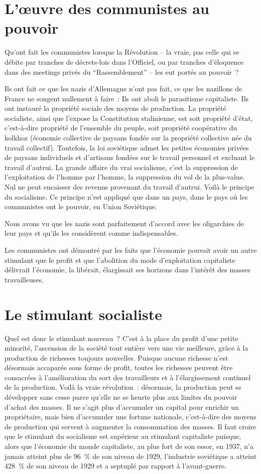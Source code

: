 \documentclass[french,twoside]{book} %
\begin{document}
\section[L’œuvre des communistes au pouvoir]{L’œuvre des communistes au pouvoir}
\noindent Qu’ont fait les communistes lorsque la Révolution – la vraie, pas celle qui se débite par tranches de décrets-lois dans l’Officiel, ou par tranches d’éloquence dans des meetings privés du “Rassemblement” – les eut portés au pouvoir ?\par
Ils ont fait ce que les nazis d’Allemagne n’ont pas fait, ce que les nazillons de France ne songent nullement à faire : Ils ont aboli le parasitisme capitaliste. Ils ont instauré la propriété sociale des moyens de production. La propriété socialiste, ainsi que l’expose la Constitution stalinienne, est soit propriété d’état, c’est-à-dire propriété de l’ensemble du peuple, soit propriété coopérative du kolkhoz (économie collective de paysans fondée sur la propriété collective née du travail collectif). Toutefois, la loi soviétique admet les petites économies privées de paysans individuels et d’artisans fondées sur le travail personnel et excluant le travail d’autrui. La grande affaire du vrai socialisme, c’est la suppression de l’exploitation de l’homme par l’homme, la suppression du vol de la plus-value. Nul ne peut encaisser des revenus provenant du travail d’autrui. Voilà le principe du socialisme. Ce principe n’est appliqué que dans un pays, dans le pays où les communistes ont le pouvoir, en Union Soviétique.\par
Nous avons vu que les nazis sont parfaitement d’accord avec les oligarchies de leur pays et qu’ils les considèrent comme indispensables.\par
Les communistes ont démontré par les faits que l’économie pouvait avoir un autre stimulant que le profit et que l’abolition du mode d’exploitation capitaliste délivrait l’économie, la libérait, élargissait ses horizons dans l’intérêt des masses travailleuses.
\section[Le stimulant socialiste]{Le stimulant socialiste}
\noindent Quel est donc le stimulant nouveau ? C’est à la place du profit d’une petite minorité, l’ascension de la société tout entière vers une vie meilleure, grâce à la production de richesses toujours nouvelles. Puisque aucune richesse n’est désormais accaparée sous forme de profit, toutes les richesses peuvent être consacrées à l’amélioration du sort des travailleurs et à l’élargissement continuel de la production. Voilà la vraie révolution : désormais, la production peut se développer sans cesse parce qu’elle ne se heurte plus aux limites du pouvoir d’achat des masses. Il ne s’agit plus d’accumuler un capital pour enrichir un propriétaire, mais bien d’accumuler une fortune nationale, c’est-à-dire des moyens de production qui servent à augmenter la consommation des masses. Il faut croire que le stimulant du socialisme est supérieur au stimulant capitaliste puisque, alors que l’économie du monde capitaliste, au plus fort de son essor, en 1937, n’a jamais atteint plus de 96 \% de son niveau de 1929, l’industrie soviétique a atteint 428 \% de son niveau de 1929 et a septuplé par rapport à l’avant-guerre.
\end{document}
